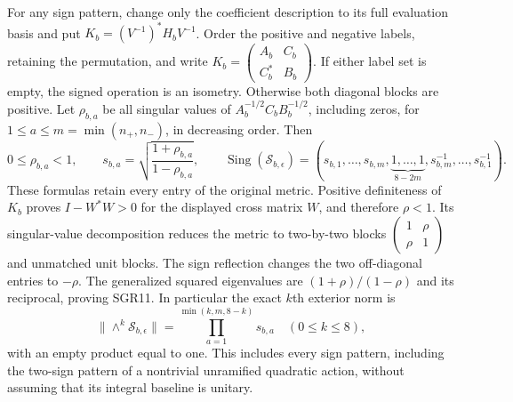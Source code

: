For any sign pattern, change only the coefficient description to its
full evaluation basis and put $K_b=(V^{-1})^*H_bV^{-1}$.
Order the positive and negative labels, retaining the permutation, and
write $K_b=\left(\begin{smallmatrix}A_b&C_b\\C_b^*&B_b\end{smallmatrix}\right)$.
If either label set is empty, the signed operation is an isometry.
Otherwise both diagonal blocks are positive. Let $\rho_{b,a}$ be
all singular values of $A_b^{-1/2}C_bB_b^{-1/2}$, including zeros,
for $1\le a\le m=\min(n_+,n_-)$, in decreasing order. Then
\[
 0\le\rho_{b,a}<1,\qquad
 s_{b,a}=\sqrt{\frac{1+\rho_{b,a}}{1-\rho_{b,a}}},\qquad
 \operatorname{Sing}(\mathscr S_{b,\epsilon})
   =(s_{b,1},\ldots,s_{b,m},
          \underbrace{1,\ldots,1}_{8-2m},
          s_{b,m}^{-1},\ldots,s_{b,1}^{-1}).
 \tag{SGR11}
\]
These formulas retain every entry of the original metric. Positive
definiteness of $K_b$ proves $I-W^*W>0$ for the displayed cross
matrix $W$, and therefore $\rho<1$. Its singular-value decomposition
reduces the metric to two-by-two blocks
$\left(\begin{smallmatrix}1&\rho\\\rho&1\end{smallmatrix}\right)$
and unmatched unit blocks. The sign reflection changes the two
off-diagonal entries to $-\rho$. The generalized squared eigenvalues
are $(1+\rho)/(1-\rho)$ and its reciprocal, proving SGR11.
In particular the exact $k$th exterior norm is
\[
 \|\wedge^k\mathscr S_{b,\epsilon}\|
    =\prod_{a=1}^{\min(k,m,8-k)}s_{b,a}\quad(0\le k\le8),
 \tag{SGR12}
\]
with an empty product equal to one. This includes every sign pattern,
including the two-sign pattern of a nontrivial unramified quadratic
action, without assuming that its integral baseline is unitary.

